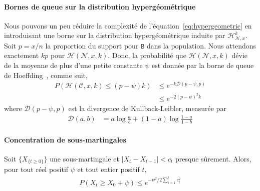 \documentclass[letterpaper,twocolumn,10pt]{article}
\theoremstyle{definition}
\begin{document}
\begin{appendices}
\paragraph{Bornes de queue sur la distribution hypergéométrique} Nous pouvons un peu réduire la complexité de l'équation~\ref{eq:hypergeometric} en introduisant une borne sur la distribution hypergéométrique induite par $\mathcal{H}^k_{\mathcal{N},x}$.
Soit $p=x/n$ la proportion du support pour $\mathtt{B}$ dans la population.
Nous attendons exactement $kp$ pour $\mathcal{H}(\mathcal{N}, x, k)$.
Donc, la probabilité que $\mathcal{H}(\mathcal{N}, x, k)$ dévie de la moyenne de plus d'une petite constante $\psi$ est donnée par la borne de queue de Hoeffding~\cite{hoeffding1963probability}, comme suit,
\begin{equation}
\begin{split}
    P(\mathcal{H}(\mathcal{C}, x, k) \leq (p-\psi)k) &\leq e^{-k\mathcal{D}(p-\psi, p)}\\
    &\leq e^{-2(p-\psi)^2k}
\end{split}
\end{equation}
where $\mathcal{D}(p-\psi, p)$ est la divergence de Kullback-Leibler, measurée par
\begin{equation}
\begin{split}
    \mathcal{D}(a, b) &= a \log \frac{a}{b} + (1 - a) \log \frac{1 - a}{1 - b}
\end{split}
\end{equation}

\paragraph{Concentration de sous-martingales}
Soit $\{X_{\{t \geq 0\}}\}$ une sous-martingale et $|X_t - X_{t-1}| < c_t$ presque sûrement. Alors, pour tout réel positif $\psi$ et tout entier positif $t$, 
\begin{equation}
\begin{split}
P(X_t \geq X_0 + \psi) \leq e^{-\psi^2 / 2\sum_{i = 1}^{t} c_t^2}
\end{split}
\label{eq:submartingale}
\end{equation}


\end{appendices}
\end{document}
